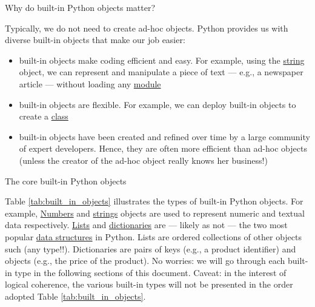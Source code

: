\documentclass[a4paper,11pt]{book}
\newcommand{\question}[1]{%
    \begin{tcolorbox}[colback=comp_c!10,colframe=comp_c,sidebyside align=top,width=\linewidth,before skip=1ex]
        #1
    \end{tcolorbox}%
    \switchcolumn%
}
\newcommand{\note}[1]{%
    \begin{tcolorbox}[colback=white!0,colframe=white!10,width=\linewidth,before skip=1ex]
        #1
    \end{tcolorbox}         
}
\begin{document}
\begin{paracol}{2}
    \question{Why do built-in Python objects matter?} 
    \note{
    Typically, we do not need to create ad-hoc objects. Python provides us with diverse built-in objects that make our job easier:
    \begin{itemize}
    	\item built-in objects make coding efficient and easy. For example, using the \href{https://docs.python.org/3/tutorial/introduction.html#strings}{string} object, we can represent and manipulate a piece of text --- e.g., a newspaper article --- without loading any \href{https://docs.python.org/3/tutorial/modules.html}{module}
    	\item built-in objects are flexible. For example, we can deploy built-in objects to create a \href{https://docs.python.org/3/tutorial/classes.html}{class}
    	\item built-in objects have been created and refined over time by a large community of expert developers. Hence, they are  often  more  efficient  than  ad-hoc objects (unless the creator of the ad-hoc object really knows her business!)
    \end{itemize}} 
\end{paracol}
\clearpage

\begin{paracol}{2}
    \question{The core built-in Python objects} 
	\note{Table \ref{tab:built_in_objects} illustrates the types of built-in Python objects. For example, \href{https://docs.python.org/3/tutorial/introduction.html#numbers}{Numbers} and \href{https://docs.python.org/3/tutorial/introduction.html#strings}{strings} objects are used to represent numeric and textual data respectively. \href{https://docs.python.org/3/tutorial/introduction.html#lists}{Lists} and \href{https://docs.python.org/3/tutorial/datastructures.html#dictionaries}{dictionaries} are --- likely as not --- the two most popular \href{https://docs.python.org/3/tutorial/datastructures.html}{data structures} in Python. Lists are ordered collections of other objects such (any type!!). Dictionaries are pairs of keys (e.g., a product identifier) and objects (e.g., the price of the product). No worries: we will go through each built-in type in the following sections of this document. Caveat: in the interest of logical coherence, the various built-in types will not be presented in the order adopted Table \ref{tab:built_in_objects}.} 
\end{paracol}
\end{document}

